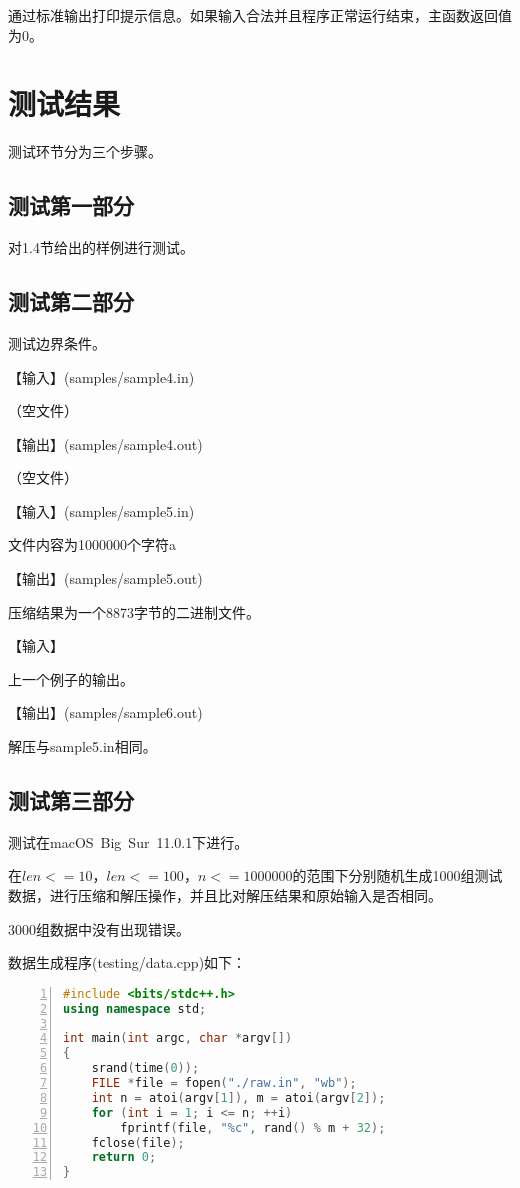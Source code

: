 \documentclass{article}
\begin{document}
通过标准输出打印提示信息。如果输入合法并且程序正常运行结束，主函数返回值为0。

\section{测试结果}

测试环节分为三个步骤。

\subsection{测试第一部分}

对1.4节给出的样例进行测试。

\subsection{测试第二部分}

测试边界条件。

【输入】(samples/sample4.in)

（空文件）

【输出】(samples/sample4.out)

（空文件）

【输入】(samples/sample5.in)

文件内容为1000000个字符a

【输出】(samples/sample5.out)

压缩结果为一个8873字节的二进制文件。

【输入】

上一个例子的输出。

【输出】(samples/sample6.out)

解压与sample5.in相同。

\subsection{测试第三部分}

测试在macOS\ Big\ Sur\ 11.0.1下进行。

在$len<=10$，$len<=100$，$n<=1000000$的范围下分别随机生成1000组测试数据，进行压缩和解压操作，并且比对解压结果和原始输入是否相同。

3000组数据中没有出现错误。

数据生成程序(testing/data.cpp)如下：

\begin{lstlisting}[language={C++},
    numbers=left,
    numberstyle=\tiny\consolas,
    basicstyle=\small\consolas]
#include <bits/stdc++.h>
using namespace std;

int main(int argc, char *argv[])
{
    srand(time(0));
    FILE *file = fopen("./raw.in", "wb");
    int n = atoi(argv[1]), m = atoi(argv[2]);
    for (int i = 1; i <= n; ++i)
        fprintf(file, "%c", rand() % m + 32);
    fclose(file);
    return 0;
}
\end{lstlisting}
\end{document}
